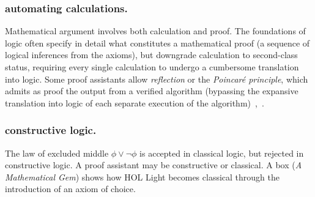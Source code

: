 \documentclass{llncs}
\begin{document}
\subsubsection{automating calculations.} Mathematical argument
involves both calculation and proof.  The foundations of logic often
specify in detail what constitutes a mathematical proof (a sequence of
logical inferences from the axioms), but downgrade calculation to
second-class status, requiring every single calculation to undergo a
cumbersome translation into logic.
Some proof assistants allow {\it reflection} or the {\it Poincar\'e
  principle}, which admits as proof the output from a verified
algorithm (bypassing the expansive translation into logic of each
separate execution of the algorithm)~\cite[p.~4]{HPSH},~\cite{BFM}.



\subsubsection{constructive logic.} The law of excluded middle
$\phi\lor\lnot \phi$ is accepted in classical logic, but rejected in
constructive logic.  A proof assistant may be constructive or
classical.  A box ({\it A Mathematical Gem}) shows how HOL Light
becomes classical through the introduction of an axiom of choice.

\newpage
\bigskip
\noindent
\end{document}
